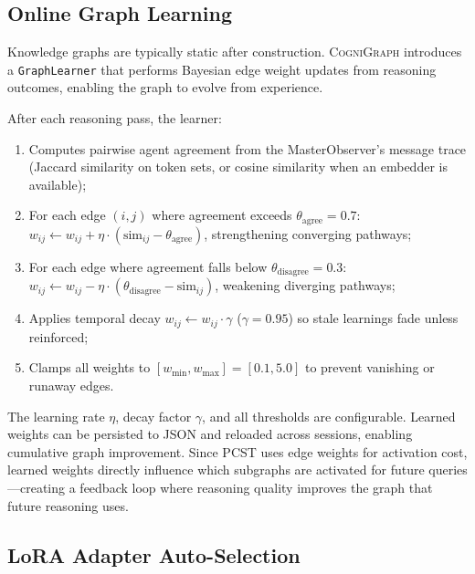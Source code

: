 \documentclass[a4paper,11pt]{article}
\theoremstyle{definition}
\newcommand{\cogni}{\textsc{CogniGraph}}
\begin{document}
\subsection{Online Graph Learning}
\label{sec:graph_learning}

Knowledge graphs are typically static after construction.
\cogni{} introduces a \texttt{GraphLearner} that performs Bayesian edge weight updates from reasoning outcomes, enabling the graph to evolve from experience.

After each reasoning pass, the learner:
\begin{enumerate}
\item Computes pairwise agent agreement from the MasterObserver's message trace (Jaccard similarity on token sets, or cosine similarity when an embedder is available);
\item For each edge $(i,j)$ where agreement exceeds $\theta_{\text{agree}} = 0.7$: $w_{ij} \leftarrow w_{ij} + \eta \cdot (\text{sim}_{ij} - \theta_{\text{agree}})$, strengthening converging pathways;
\item For each edge where agreement falls below $\theta_{\text{disagree}} = 0.3$: $w_{ij} \leftarrow w_{ij} - \eta \cdot (\theta_{\text{disagree}} - \text{sim}_{ij})$, weakening diverging pathways;
\item Applies temporal decay $w_{ij} \leftarrow w_{ij} \cdot \gamma$ ($\gamma = 0.95$) so stale learnings fade unless reinforced;
\item Clamps all weights to $[w_{\min}, w_{\max}] = [0.1, 5.0]$ to prevent vanishing or runaway edges.
\end{enumerate}

The learning rate $\eta$, decay factor $\gamma$, and all thresholds are configurable.
Learned weights can be persisted to JSON and reloaded across sessions, enabling cumulative graph improvement.
Since PCST uses edge weights for activation cost, learned weights directly influence which subgraphs are activated for future queries—creating a feedback loop where reasoning quality improves the graph that future reasoning uses.

\subsection{LoRA Adapter Auto-Selection}
\label{sec:lora_auto}
\end{document}
